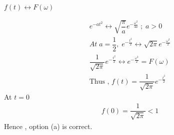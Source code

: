 \documentclass[journal,12pt,twocolumn]{IEEEtran}
\theoremstyle{remark}
\begin{document}
\begin{center}
 $f(t) \longleftrightarrow F(\omega)$
\end{center}
 \begin{align}
e^{-at^{2}}  \longleftrightarrow  \sqrt{\dfrac{\pi}{a}}
e^{-\frac{\omega^2}{4a}} \; ; \; a > 0 \\
At \; a = \dfrac{1}{2} , \; e^{-\frac{t^{2}}{2}}  \longleftrightarrow  \sqrt{2\pi} e^{-\frac{\omega^2}{2}}\\
\dfrac{1}{\sqrt{2\pi}}e^{-\frac{t^{2}}{2}}  \longleftrightarrow  e^{-\frac{\omega^2}{2}} = F(\omega) \\
\text{Thus , } f(t) = \dfrac{1}{\sqrt{2\pi}}e^{-\frac{t^{2}}{2}} 
 \end{align}
 At $t = 0$  \begin{align}
 f(0) = \dfrac{1}{\sqrt{2\pi}} < 1
 \end{align}
 Hence , option (a) is correct.
\end{document}

